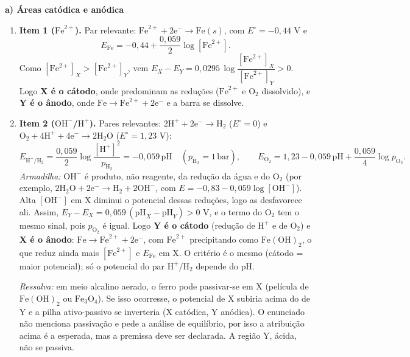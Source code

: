 \documentclass{article}%
\begin{document}
\textbf{a) Áreas catódica e anódica}

\begin{enumerate}
\item \textbf{Item 1 ($\mathrm{Fe}^{2+}$).} Par relevante: $\mathrm{Fe}^{2+} + 2\mathrm{e}^- \rightarrow \mathrm{Fe}(s)$, com $E^\circ = -0{,}44$ V e
\[
E_{\mathrm{Fe}} = -0{,}44 + \frac{0{,}059}{2}\log[\mathrm{Fe}^{2+}].
\]
Como $[\mathrm{Fe}^{2+}]_X > [\mathrm{Fe}^{2+}]_Y$, vem $E_X - E_Y = 0{,}0295\,\log\dfrac{[\mathrm{Fe}^{2+}]_X}{[\mathrm{Fe}^{2+}]_Y} > 0$. Logo \textbf{X é o cátodo}, onde predominam as reduções ($\mathrm{Fe}^{2+}$ e $\mathrm{O}_2$ dissolvido), e \textbf{Y é o ânodo}, onde $\mathrm{Fe} \rightarrow \mathrm{Fe}^{2+} + 2\mathrm{e}^-$ e a barra se dissolve.

\item \textbf{Item 2 ($\mathrm{OH}^-$/$\mathrm{H}^+$).} Pares relevantes: $2\mathrm{H}^+ + 2\mathrm{e}^- \rightarrow \mathrm{H}_2$ ($E^\circ = 0$) e $\mathrm{O}_2 + 4\mathrm{H}^+ + 4\mathrm{e}^- \rightarrow 2\mathrm{H}_2\mathrm{O}$ ($E^\circ = 1{,}23$ V):
\[
E_{\mathrm{H}^+/\mathrm{H}_2} = \frac{0{,}059}{2}\log\frac{[\mathrm{H}^+]^2}{p_{\mathrm{H}_2}} = -0{,}059\,\mathrm{pH} \quad (p_{\mathrm{H}_2} = 1\,\mathrm{bar}), \qquad E_{\mathrm{O}_2} = 1{,}23 - 0{,}059\,\mathrm{pH} + \frac{0{,}059}{4}\log p_{\mathrm{O}_2}.
\]
\textit{Armadilha:} $\mathrm{OH}^-$ é produto, não reagente, da redução da água e do $\mathrm{O}_2$ (por exemplo, $2\mathrm{H}_2\mathrm{O} + 2\mathrm{e}^- \rightarrow \mathrm{H}_2 + 2\mathrm{OH}^-$, com $E = -0{,}83 - 0{,}059\log[\mathrm{OH}^-]$). Alta $[\mathrm{OH}^-]$ em X diminui o potencial dessas reduções, logo as desfavorece ali. Assim, $E_Y - E_X = 0{,}059\,(\mathrm{pH}_X - \mathrm{pH}_Y) > 0$ V, e o termo do $\mathrm{O}_2$ tem o mesmo sinal, pois $p_{\mathrm{O}_2}$ é igual. Logo \textbf{Y é o cátodo} (redução de $\mathrm{H}^+$ e de $\mathrm{O}_2$) e \textbf{X é o ânodo}: $\mathrm{Fe} \rightarrow \mathrm{Fe}^{2+} + 2\mathrm{e}^-$, com $\mathrm{Fe}^{2+}$ precipitando como $\mathrm{Fe(OH)}_2$, o que reduz ainda mais $[\mathrm{Fe}^{2+}]$ e $E_{\mathrm{Fe}}$ em X. O critério é o mesmo (cátodo = maior potencial); só o potencial do par $\mathrm{H}^+/\mathrm{H}_2$ depende do $\mathrm{pH}$.

\textit{Ressalva:} em meio alcalino aerado, o ferro pode passivar-se em X (película de $\mathrm{Fe(OH)}_2$ ou $\mathrm{Fe}_3\mathrm{O}_4$). Se isso ocorresse, o potencial de X subiria acima do de Y e a pilha ativo-passivo se inverteria (X catódica, Y anódica). O enunciado não menciona passivação e pede a análise de equilíbrio, por isso a atribuição acima é a esperada, mas a premissa deve ser declarada. A região Y, ácida, não se passiva.


\end{enumerate}
\end{document}
